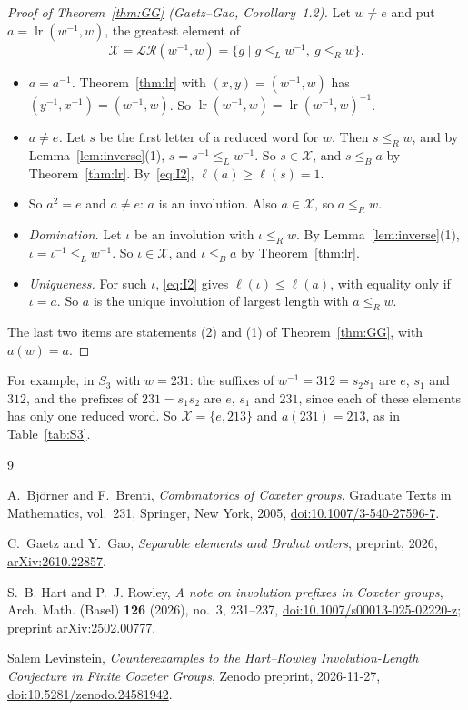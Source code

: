 \documentclass[11pt]{amsart}
\theoremstyle{definition}
\theoremstyle{remark}
\numberwithin{equation}{section}
\newcommand{\LR}{\mathcal{LR}}
\newcommand{\X}{\mathcal{X}}
\newcommand{\leR}{\le_R}
\newcommand{\leL}{\le_L}
\newcommand{\leB}{\le_B}
\DeclareMathOperator{\lr}{lr}
\begin{document}
\begin{proof}[Proof of Theorem~\ref{thm:GG} (Gaetz--Gao, Corollary~1.2)]
Let \(w\neq e\) and put \(a=\lr(w^{-1},w)\), the greatest element of
\[
\X=\LR(w^{-1},w)=\{g\mid g\leL w^{-1},\ g\leR w\}.
\]
\begin{itemize}
\item \emph{\(a=a^{-1}\).} Theorem~\ref{thm:lr} with \((x,y)=(w^{-1},w)\) has \((y^{-1},x^{-1})=(w^{-1},w)\). So \(\lr(w^{-1},w)=\lr(w^{-1},w)^{-1}\).
\item \emph{\(a\neq e\).} Let \(s\) be the first letter of a reduced word for \(w\). Then \(s\leR w\), and by Lemma~\ref{lem:inverse}(1), \(s=s^{-1}\leL w^{-1}\). So \(s\in\X\), and \(s\leB a\) by Theorem~\ref{thm:lr}. By~\eqref{eq:I2}, \(\ell(a)\ge\ell(s)=1\).
\item So \(a^2=e\) and \(a\neq e\): \(a\) is an involution. Also \(a\in\X\), so \(a\leR w\).
\item \emph{Domination.} Let \(\iota\) be an involution with \(\iota\leR w\). By Lemma~\ref{lem:inverse}(1), \(\iota=\iota^{-1}\leL w^{-1}\). So \(\iota\in\X\), and \(\iota\leB a\) by Theorem~\ref{thm:lr}.
\item \emph{Uniqueness.} For such \(\iota\), \eqref{eq:I2} gives \(\ell(\iota)\le\ell(a)\), with equality only if \(\iota=a\). So \(a\) is the unique involution of largest length with \(a\leR w\).
\end{itemize}
The last two items are statements (2) and (1) of Theorem~\ref{thm:GG}, with \(a(w)=a\).
\end{proof}

For example, in \(S_3\) with \(w=231\): the suffixes of \(w^{-1}=312=s_2s_1\) are \(e\), \(s_1\) and \(312\), and the prefixes of \(231=s_1s_2\) are \(e\), \(s_1\) and \(231\), since each of these elements has only one reduced word. So \(\X=\{e,213\}\) and \(a(231)=213\), as in Table~\ref{tab:S3}.

\begin{thebibliography}{9}

A.~Bj\"orner and F.~Brenti, \emph{Combinatorics of {C}oxeter groups}, Graduate Texts in Mathematics, vol.~231, Springer, New York, 2005, \href{https://doi.org/10.1007/3-540-27596-7}{doi:10.1007/3-540-27596-7}.

C.~Gaetz and Y.~Gao, \emph{Separable elements and {B}ruhat orders}, preprint, 2026, \href{https://arxiv.org/abs/2610.22857}{arXiv:2610.22857}.

S.~B. Hart and P.~J. Rowley, \emph{A note on involution prefixes in {C}oxeter groups}, Arch. Math. (Basel) \textbf{126} (2026), no.~3, 231--237, \href{https://doi.org/10.1007/s00013-025-02220-z}{doi:10.1007/s00013-025-02220-z}; preprint \href{https://arxiv.org/abs/2502.00777}{arXiv:2502.00777}.

Salem Levinstein, \emph{Counterexamples to the {H}art--{R}owley {I}nvolution-{L}ength {C}onjecture in {F}inite {C}oxeter {G}roups}, Zenodo preprint, 2026-11-27, \href{https://doi.org/10.5281/zenodo.24581942}{doi:10.5281/zenodo.24581942}.

\end{thebibliography}
\end{document}
